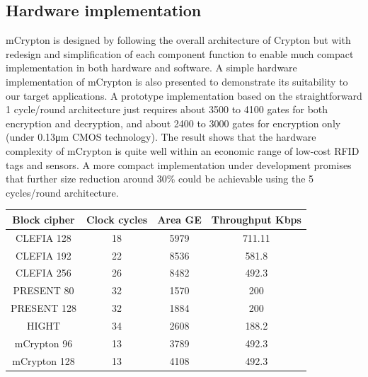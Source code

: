 \documentclass{transcrypto}
\begin{document}
	\subsection{Hardware implementation}
	 mCrypton is designed by following the overall architecture of Crypton but with redesign and simplification of each component function to enable much compact implementation in both hardware and software. A simple hardware implementation of mCrypton is also presented to demonstrate its suitability to our target applications. A prototype implementation based on the straightforward 1 cycle/round architecture just requires about 3500 to 4100 gates for both encryption and decryption, and about 2400 to 3000 gates for encryption only (under 0.13μm CMOS technology). The result shows that the hardware complexity of mCrypton is quite well within an economic range of low-cost RFID tags and sensors. A more compact implementation under development promises that further size reduction around 30\% could be achievable using the 5 cycles/round architecture.
	\begin{table}[H]
		\centering
		\begin{tabular}{|c|c|c|c|}
			\hline
			\textbf{Block cipher} & \textbf{Clock cycles} & \textbf{Area
				GE} & \textbf{Throughput
				Kbps}\\
			\hline
			CLEFIA 128 &18 &5979 &711.11 \\
			\hline
			CLEFIA 192 &22 &8536 &581.8 \\
			\hline
			CLEFIA 256 &26 &8482 &492.3 \\
			\hline
			PRESENT 80 &32 &1570 & 200 \\
			\hline
			PRESENT 128&32 &1884 & 200 \\
			\hline
			HIGHT &34 &2608 &188.2 \\
			\hline
			mCrypton 96 &13 &3789 &492.3 \\
			\hline
			mCrypton 128&13 & 4108&492.3 \\
			\hline
		\end{tabular}
	\end{table}
\end{document}
